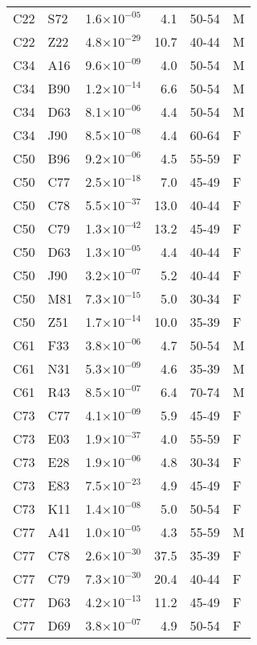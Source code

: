 \begin{longtable}{lllrll}
   C22 & S72 & 1.6$\times10^{-05}$ & 4.1 & 50-54 & M \\ 
   C22 & Z22 & 4.8$\times10^{-29}$ & 10.7 & 40-44 & M \\ 
   C34 & A16 & 9.6$\times10^{-09}$ & 4.0 & 50-54 & M \\ 
   C34 & B90 & 1.2$\times10^{-14}$ & 6.6 & 50-54 & M \\ 
   C34 & D63 & 8.1$\times10^{-06}$ & 4.4 & 50-54 & M \\ 
   C34 & J90 & 8.5$\times10^{-08}$ & 4.4 & 60-64 & F \\ 
   C50 & B96 & 9.2$\times10^{-06}$ & 4.5 & 55-59 & F \\ 
   C50 & C77 & 2.5$\times10^{-18}$ & 7.0 & 45-49 & F \\ 
   C50 & C78 & 5.5$\times10^{-37}$ & 13.0 & 40-44 & F \\ 
   C50 & C79 & 1.3$\times10^{-42}$ & 13.2 & 45-49 & F \\ 
   C50 & D63 & 1.3$\times10^{-05}$ & 4.4 & 40-44 & F \\ 
   C50 & J90 & 3.2$\times10^{-07}$ & 5.2 & 40-44 & F \\ 
   C50 & M81 & 7.3$\times10^{-15}$ & 5.0 & 30-34 & F \\ 
   C50 & Z51 & 1.7$\times10^{-14}$ & 10.0 & 35-39 & F \\ 
   C61 & F33 & 3.8$\times10^{-06}$ & 4.7 & 50-54 & M \\ 
   C61 & N31 & 5.3$\times10^{-09}$ & 4.6 & 35-39 & M \\ 
   C61 & R43 & 8.5$\times10^{-07}$ & 6.4 & 70-74 & M \\ 
   C73 & C77 & 4.1$\times10^{-09}$ & 5.9 & 45-49 & F \\ 
   C73 & E03 & 1.9$\times10^{-37}$ & 4.0 & 55-59 & F \\ 
   C73 & E28 & 1.9$\times10^{-06}$ & 4.8 & 30-34 & F \\ 
   C73 & E83 & 7.5$\times10^{-23}$ & 4.9 & 45-49 & F \\ 
   C73 & K11 & 1.4$\times10^{-08}$ & 5.0 & 50-54 & F \\ 
   C77 & A41 & 1.0$\times10^{-05}$ & 4.3 & 55-59 & M \\ 
   C77 & C78 & 2.6$\times10^{-30}$ & 37.5 & 35-39 & F \\ 
   C77 & C79 & 7.3$\times10^{-30}$ & 20.4 & 40-44 & F \\ 
   C77 & D63 & 4.2$\times10^{-13}$ & 11.2 & 45-49 & F \\ 
   C77 & D69 & 3.8$\times10^{-07}$ & 4.9 & 50-54 & F \\ 

\end{longtable}
